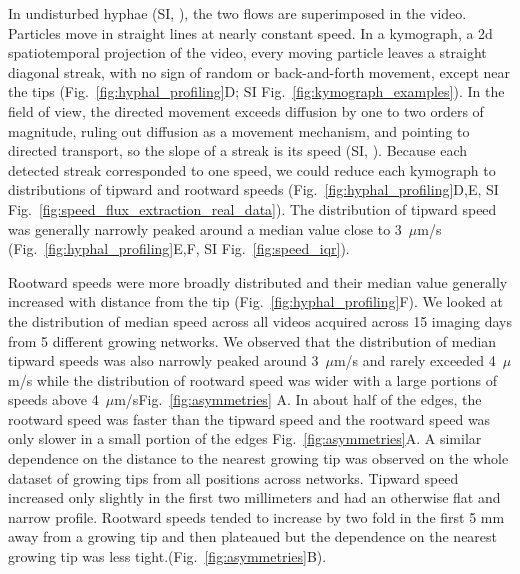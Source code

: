 In undisturbed hyphae (SI, ), the two flows are superimposed in the video. Particles move in straight lines at nearly constant speed. In a kymograph, a 2d spatiotemporal projection of the video, every moving particle leaves a straight diagonal streak, with no sign of random or back-and-forth movement, except near the tips (Fig.~\ref{fig:hyphal_profiling}D; SI Fig.~\ref{fig:kymograph_examples}).
In the field of view, the directed movement exceeds diffusion by one to two orders of magnitude, ruling out diffusion as a movement mechanism, and pointing to directed transport, so the slope of a streak is its speed (SI, ).
Because each detected streak corresponded to one speed, we could reduce each kymograph to  distributions of tipward and rootward speeds (Fig.~\ref{fig:hyphal_profiling}D,E, SI Fig.~\ref{fig:speed_flux_extraction_real_data}).
The distribution of tipward speed was generally narrowly peaked around a median value close to 3~$\mu$m/s (Fig.~\ref{fig:hyphal_profiling}E,F, SI Fig.~\ref{fig:speed_iqr}).

Rootward speeds were more broadly distributed and their median value generally increased with distance from the tip (Fig.~\ref{fig:hyphal_profiling}F).
We looked at the distribution of median speed across all videos acquired across 15 imaging days from 5 different growing networks. We observed that the distribution of median tipward speeds was also narrowly peaked around 3~$\mu$m/s and rarely exceeded 4~$\mu$m/s while the distribution of rootward speed was wider with a large portions of speeds above 4~$\mu$m/sFig.~\ref{fig:asymmetries} A. In about half of the edges, the rootward speed was faster than the tipward speed and the rootward speed was only slower in a small portion of the edges Fig.~\ref{fig:asymmetries}A.
A similar dependence on the distance to the nearest growing tip was observed on the whole dataset of growing tips from all positions across networks. Tipward speed increased only slightly in the first two millimeters and had an otherwise flat and narrow profile. Rootward speeds tended to increase by two fold in the first 5 mm away from a growing tip and then plateaued but the dependence on the nearest growing tip was less tight.(Fig.~\ref{fig:asymmetries}B). 

